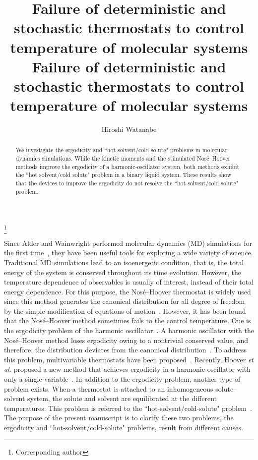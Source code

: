 \documentclass[pre,twocolumn]{revtex4}
\begin{document}
\title{Failure of deterministic and stochastic thermostats
to control temperature of molecular systems
}
\title{Failure of deterministic and stochastic thermostats
to control temperature of molecular systems
}

\author{Hiroshi Watanabe}
\thanks{Corresponding author}

\begin{abstract}
We investigate the ergodicity and ``hot solvent/cold solute" problems in
molecular dynamics simulations. While the kinetic moments and the stimulated Nos\'e--Hoover methods improve the ergodicity of a harmonic-oscillator system, both methods exhibit the ``hot solvent/cold solute" problem in a binary liquid system. These results show that the devices to improve the ergodicity do not resolve the ``hot solvent/cold solute" problem.
\end{abstract}

\maketitle

Since Alder and Wainwright performed molecular dynamics (MD) simulations for the first time~\cite{Alder1957},
they have been useful tools for exploring a wide variety of science.
Traditional MD simulations lead to an isoenergetic condition, that is,
the total energy of the system is conserved throughout its time evolution.
However, the temperature dependence of observables is usually of interest, instead of their total energy dependence. For this purpose, the Nos\'e--Hoover thermostat is widely used
since this method generates the canonical distribution for all degree of freedom by the simple modification of equations of motion~\cite{Hoover1985}.
However, it has been found that the Nos\'e--Hoover method sometimes fails to the control temperature.
One is the ergodicity problem of the harmonic oscillator~\cite{Hoover1985}.
A harmonic oscillator with the Nos\'e--Hoover method loses ergodicity owing to a nontrivial conserved value, and therefore, the distribution deviates from the canonical distribution~\cite{Watanabe2007, Legoll2007}.
To address this problem, multivariable thermostats have been proposed~\cite{Martyna_1992, Ju_1993, Hoover_1996}.
Recently, Hoover \textit{et al.} proposed a new method that achieves ergodicity in a harmonic oscillator with only a single variable~\cite{Hoover_2016}.
In addition to the ergodicity problem, another type of problem exists.
When a thermostat is attached to an inhomogeneous solute--solvent system,
the solute and solvent are equilibrated at the different temperatures.
This problem is referred to the ``hot-solvent/cold-solute" problem~\cite{Lingenheil2008}. 
The purpose of the present manuscript is to clarify these two problems, the ergodicity and ``hot-solvent/cold-solute" problems, result from different causes.
\end{document}
